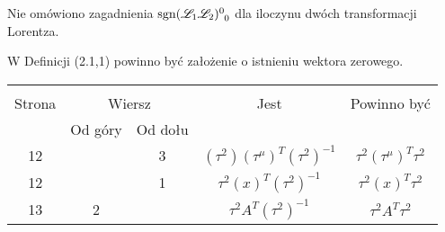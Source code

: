 \documentclass[a4paper,11pt]{article}
\begin{document}
\vspace{\spaceTwo}















\vspace{\spaceFour}



\start {} Nie omówiono zagadnienia
$\sgn\tensor{ ( \Lcal_{ 1 } \Lcal_{ 2 } ) }{^{ 0 }_{ 0 }}$ dla iloczynu dwóch
transformacji Lorentza.

\vspace{\spaceFour}



 W Definicji (2.1,1) powinno być założenie o istnieniu
wektora zerowego.







\begin{center}

  \begin{tabular}{|c|c|c|c|c|}
    \hline
    & \multicolumn{2}{c|}{} & & \\
    Strona & \multicolumn{2}{c|}{Wiersz} & Jest
                              & Powinno być \\ \cline{2-3}
    & Od góry & Od dołu & & \\
    \hline
    12 & &  3 & $( \tau^{ 2 } )( \tau^{ \mu } )^{ T }( \tau^{ 2 } )^{ -1 }$
           & $\tau^{ 2 } ( \tau^{ \mu } )^{ T } \tau^{ 2 }$ \\
    12 & & 1 & $\tau^{ 2 } ( x )^{ T }( \tau^{ 2 } )^{ -1 }$
           & $\tau^{ 2 } ( x )^{ T } \tau^{ 2 }$ \\ %
    13 & 2 & & $\tau^{ 2 } A^{ T }( \tau^{ 2 } )^{ -1 }$
           & $\tau^{ 2 } A^{ T } \tau^{ 2 }$ \\
    \hline
  \end{tabular}

\end{center}
\end{document}
